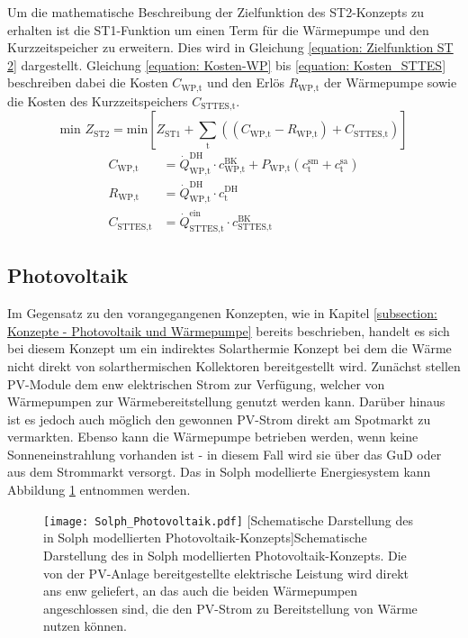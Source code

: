 Um die mathematische Beschreibung der Zielfunktion des ST2-Konzepts zu erhalten ist die ST1-Funktion um einen Term für die Wärmepumpe und den Kurzzeitspeicher zu erweitern. Dies wird in Gleichung \ref{equation: Zielfunktion ST 2} dargestellt. Gleichung \ref{equation: Kosten-WP} bis \ref{equation: Kosten_STTES} beschreiben dabei die Kosten $C_\text{WP,t}$ und den Erlös $R_\text{WP,t}$ der Wärmepumpe sowie die Kosten des Kurzzeitspeichers $C_{\text{STTES,t}}$.
	\begin{equation}
		\label{equation: Zielfunktion ST 2}
		\text{min } Z_\text{ST2} = \text{min} \left[Z_\text{ST1} + \sum_{\text{t}}^{} ((C_\text{WP,t} - R_\text{WP,t}) + C_\text{STTES,t}) \right]
	\end{equation}
	\begin{align}
		\label{equation: Kosten-WP}
		C_\text{WP,t} &= \dot{Q}_\text{WP,t}^\text{DH} \cdot c_\text{WP,t}^\text{BK} + P_\text{WP,t} (c_\text{t}^\text{sm} + c_\text{t}^\text{sa}) \\
		R_\text{WP,t} &= \dot{Q}_\text{WP,t}^\text{DH} \cdot c_\text{t}^\text{DH}\\
		\label{equation: Kosten_STTES}
		C_{\text{STTES,t}} &= \dot{Q}_{\text{STTES,t}}^{\text{ein}} \cdot c_\text{STTES,t}^\text{BK}
	\end{align}

\subsection{Photovoltaik}
Im Gegensatz zu den vorangegangenen Konzepten, wie in Kapitel \ref{subsection: Konzepte - Photovoltaik und Wärmepumpe} bereits beschrieben, handelt es sich bei diesem Konzept um ein indirektes Solarthermie Konzept bei dem die Wärme nicht direkt von solarthermischen Kollektoren bereitgestellt wird. Zunächst stellen \ac{PV}-Module dem enw elektrischen Strom zur Verfügung, welcher von Wärmepumpen zur Wärmebereitstellung genutzt werden kann. Darüber hinaus ist es jedoch auch möglich den gewonnen \ac{PV}-Strom direkt am Spotmarkt zu vermarkten. Ebenso kann die Wärmepumpe betrieben werden, wenn keine Sonneneinstrahlung vorhanden ist - in diesem Fall wird sie über das \ac{GuD} oder aus dem Strommarkt versorgt. Das in Solph modellierte Energiesystem kann Abbildung \ref{figure: Solph_Photovoltaik} entnommen werden.
	\begin{figure}[ht]
		\centering
		\texttt{[image: Solph\_Photovoltaik.pdf]}
		[Schematische Darstellung des in Solph modellierten Photovoltaik-Konzepts]{Schematische Darstellung des in Solph modellierten Photovoltaik-Konzepts. Die von der \ac{PV}-Anlage bereitgestellte elektrische Leistung wird direkt ans enw geliefert, an das auch die beiden Wärmepumpen angeschlossen sind, die den \ac{PV}-Strom zu Bereitstellung von Wärme nutzen können.}
		\label{figure: Solph_Photovoltaik}
	\end{figure}


